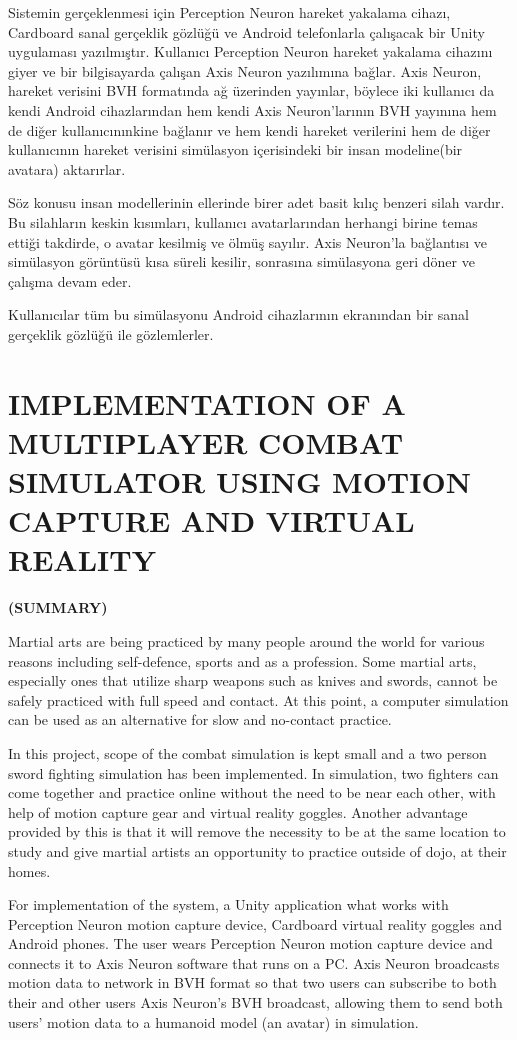 \documentclass[a4paper, 12pt, titlepage]{article}
\newcommand{\thetitle}{IMPLEMENTATION OF A MULTIPLAYER COMBAT SIMULATOR USING MOTION CAPTURE AND
                       VIRTUAL REALITY}
\begin{document}
Sistemin gerçeklenmesi için Perception Neuron hareket yakalama cihazı, Cardboard sanal gerçeklik
gözlüğü ve Android telefonlarla çalışacak bir Unity uygulaması yazılmıştır. Kullanıcı Perception
Neuron hareket yakalama cihazını giyer ve bir bilgisayarda çalışan Axis Neuron yazılımına bağlar.
Axis Neuron, hareket verisini BVH formatında ağ üzerinden yayınlar, böylece iki kullanıcı da kendi
Android cihazlarından hem kendi Axis Neuron’larının BVH yayınına hem de diğer kullanıcınınkine
bağlanır ve hem kendi hareket verilerini hem de diğer kullanıcının hareket verisini simülasyon
içerisindeki bir insan modeline(bir avatara) aktarırlar.

Söz konusu insan modellerinin ellerinde birer adet basit kılıç benzeri silah vardır. Bu silahların
keskin kısımları, kullanıcı avatarlarından herhangi birine temas ettiği takdirde, o avatar kesilmiş
ve ölmüş sayılır. Axis Neuron’la bağlantısı ve simülasyon görüntüsü kısa süreli kesilir, sonrasına
simülasyona geri döner ve çalışma devam eder.

Kullanıcılar tüm bu simülasyonu Android cihazlarının ekranından bir sanal gerçeklik gözlüğü ile
gözlemlerler.

\newpage
\section*{\centering\thetitle}
\centerline{\fontsize{16pt}{21.6pt}\sffamily\bfseries (SUMMARY)}
Martial arts are being practiced by many people around the world for various reasons including
self-defence, sports and as a profession. Some martial arts, especially ones that utilize sharp
weapons such as knives and swords, cannot be safely practiced with full speed and contact. At this
point, a computer simulation can be used as an alternative for slow and no-contact practice.

In this project, scope of the combat simulation is kept small and a two person sword fighting
simulation has been implemented. In simulation, two fighters can come together and practice online
without the need to be near each other, with help of motion capture gear and virtual reality
goggles. Another advantage provided by this is that it will remove the necessity to be at the same
location to study and give martial artists an opportunity to practice outside of dojo, at their
homes.

For implementation of the system, a Unity application what works with Perception Neuron motion
capture device, Cardboard virtual reality goggles and Android phones. The user wears Perception
Neuron motion capture device and connects it to Axis Neuron software that runs on a PC. Axis Neuron
broadcasts motion data to network in BVH format so that two users can subscribe to both their and
other users Axis Neuron’s BVH broadcast, allowing them to send both users’ motion data to a
humanoid model (an avatar) in simulation.
\end{document}
